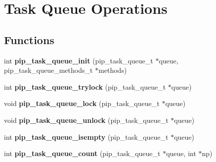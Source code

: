 \hypertarget{group__ulp-1-task-queue}{\section{Task Queue Operations}
\label{group__ulp-1-task-queue}
}
\subsection*{Functions}
\begin{DoxyCompactItemize}
\item 
\hypertarget{group__ulp-1-task-queue_ga9c50d9b2b810d97a75a5fe9c332902e0}{int {\bfseries pip\-\_\-task\-\_\-queue\-\_\-init} (pip\-\_\-task\-\_\-queue\-\_\-t $\ast$queue, pip\-\_\-task\-\_\-queue\-\_\-methods\-\_\-t $\ast$methods)}\label{group__ulp-1-task-queue_ga9c50d9b2b810d97a75a5fe9c332902e0}

\item 
\hypertarget{group__ulp-1-task-queue_ga20d50746c585f1ede68f2c9aefc39a5c}{int {\bfseries pip\-\_\-task\-\_\-queue\-\_\-trylock} (pip\-\_\-task\-\_\-queue\-\_\-t $\ast$queue)}\label{group__ulp-1-task-queue_ga20d50746c585f1ede68f2c9aefc39a5c}

\item 
\hypertarget{group__ulp-1-task-queue_gaf7f6e26e29752a148704108bdcc7756f}{void {\bfseries pip\-\_\-task\-\_\-queue\-\_\-lock} (pip\-\_\-task\-\_\-queue\-\_\-t $\ast$queue)}\label{group__ulp-1-task-queue_gaf7f6e26e29752a148704108bdcc7756f}

\item 
\hypertarget{group__ulp-1-task-queue_gaf4cfe9905f1862718f65ba2fda961b84}{void {\bfseries pip\-\_\-task\-\_\-queue\-\_\-unlock} (pip\-\_\-task\-\_\-queue\-\_\-t $\ast$queue)}\label{group__ulp-1-task-queue_gaf4cfe9905f1862718f65ba2fda961b84}

\item 
\hypertarget{group__ulp-1-task-queue_gabf772cd5ea121458291801a26dea5c9d}{int {\bfseries pip\-\_\-task\-\_\-queue\-\_\-isempty} (pip\-\_\-task\-\_\-queue\-\_\-t $\ast$queue)}\label{group__ulp-1-task-queue_gabf772cd5ea121458291801a26dea5c9d}

\item 
\hypertarget{group__ulp-1-task-queue_ga5a043af776eb89933bfc0a057790cc82}{int {\bfseries pip\-\_\-task\-\_\-queue\-\_\-count} (pip\-\_\-task\-\_\-queue\-\_\-t $\ast$queue, int $\ast$np)}\label{group__ulp-1-task-queue_ga5a043af776eb89933bfc0a057790cc82}


\end{DoxyCompactItemize}
